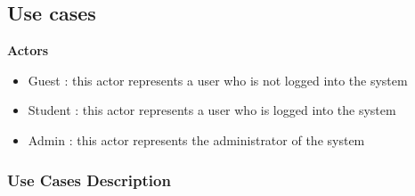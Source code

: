 \documentclass[a4paper, oneside]{article}
\begin{document}
\clearpage

\subsection{Use cases}

\textbf{Actors}
\begin{itemize}
\item{Guest : this actor represents a user who is not logged into the system}
\item{Student : this actor represents a user who is logged into the system}
\item{Admin : this actor represents the administrator of the system}
\end{itemize}

\subsubsection{Use Cases Description}
\end{document}
